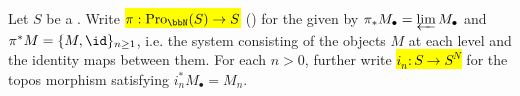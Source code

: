 \begin{context}\label{context:ekedahl_af_topos_morphisms_to_and_from_Pro_N_S_to_S}
    Let $S$ be a .
    Write \hl{$\pi: \mathrm{Pro}_\bbN(S) \to S$} () for the  given by $\pi_* M_\bullet = \varprojlim M_\bullet$ and $\pi^* M = \{M, \id\}_{n \geq 1}$, i.e. the system consisting of the objects $M$ at each level and the identity maps between them. For each $n > 0$, further write \hl{$i_n: S \to S^N$} for the topos morphism satisfying $i_n^* M_\bullet = M_n$. 
\end{context}